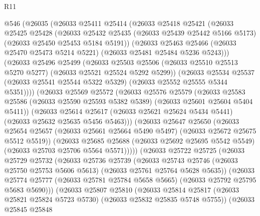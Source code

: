 \begin{lexlean}{R11}
\begin{coremodule}
{{{{{{{{{{{{{{{{{{{{{{{{{{{{{{{{{{{{{{{{{{{{{{{{{{{{{{{{{{{{{{{{{{{{{{{{{{{{{{{{{{    @546
      (@26035
        (@26033
          @25411
          @25414
          (@26033
            @25418
            @25421
            (@26033
              @25425
              @25428
              (@26033
                @25432
                @25435
                (@26033 @25439 @25442 @5166 @5173)
                (@26033 @25450 @25453 @5184 @5191))
              (@26033
                @25463
                @25466
                (@26033 @25470 @25473 @5214 @5221)
                (@26033 @25481 @25484 @5236 @5243)))
            (@26033
              @25496
              @25499
              (@26033
                @25503
                @25506
                (@26033 @25510 @25513 @5270 @5277)
                (@26033 @25521 @25524 @5292 @5299))
              (@26033
                @25534
                @25537
                (@26033 @25541 @25544 @5322 @5329)
                (@26033 @25552 @25555 @5344 @5351))))
          (@26033
            @25569
            @25572
            (@26033
              @25576
              @25579
              (@26033
                @25583
                @25586
                (@26033 @25590 @25593 @5382 @5389)
                (@26033 @25601 @25604 @5404 @5411))
              (@26033
                @25614
                @25617
                (@26033 @25621 @25624 @5434 @5441)
                (@26033 @25632 @25635 @5456 @5463)))
            (@26033
              @25647
              @25650
              (@26033
                @25654
                @25657
                (@26033 @25661 @25664 @5490 @5497)
                (@26033 @25672 @25675 @5512 @5519))
              (@26033
                @25685
                @25688
                (@26033 @25692 @25695 @5542 @5549)
                (@26033 @25703 @25706 @5564 @5571)))))
        (@26033
          @25722
          @25725
          (@26033
            @25729
            @25732
            (@26033
              @25736
              @25739
              (@26033
                @25743
                @25746
                (@26033 @25750 @25753 @5606 @5613)
                (@26033 @25761 @25764 @5628 @5635))
              (@26033
                @25774
                @25777
                (@26033 @25781 @25784 @5658 @5665)
                (@26033 @25792 @25795 @5683 @5690)))
            (@26033
              @25807
              @25810
              (@26033
                @25814
                @25817
                (@26033 @25821 @25824 @5723 @5730)
                (@26033 @25832 @25835 @5748 @5755))
              (@26033
                @25845
                @25848
}}}}}}}}}}}}}}}}}}}}}}}}}}}}}}}}}}}}}}}}}}}}}}}}}}}}}}}}}}}}}}}}}}}}}}}}}}}}}}}}}}
\end{coremodule}
\end{lexlean}

